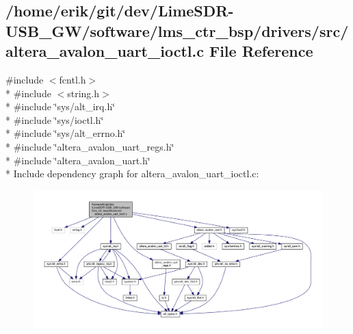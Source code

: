 \subsection{/home/erik/git/dev/\+Lime\+S\+D\+R-\/\+U\+S\+B\+\_\+\+G\+W/software/lms\+\_\+ctr\+\_\+bsp/drivers/src/altera\+\_\+avalon\+\_\+uart\+\_\+ioctl.c File Reference}
\label{altera__avalon__uart__ioctl_8c}
{\ttfamily \#include $<$fcntl.\+h$>$}\\*
{\ttfamily \#include $<$string.\+h$>$}\\*
{\ttfamily \#include \char`\"{}sys/alt\+\_\+irq.\+h\char`\"{}}\\*
{\ttfamily \#include \char`\"{}sys/ioctl.\+h\char`\"{}}\\*
{\ttfamily \#include \char`\"{}sys/alt\+\_\+errno.\+h\char`\"{}}\\*
{\ttfamily \#include \char`\"{}altera\+\_\+avalon\+\_\+uart\+\_\+regs.\+h\char`\"{}}\\*
{\ttfamily \#include \char`\"{}altera\+\_\+avalon\+\_\+uart.\+h\char`\"{}}\\*
Include dependency graph for altera\+\_\+avalon\+\_\+uart\+\_\+ioctl.\+c\+:
\nopagebreak
\begin{figure}[H]
\begin{center}
\leavevmode
\includegraphics[width=350pt]{d2/d62/altera__avalon__uart__ioctl_8c__incl}
\end{center}
\end{figure}
